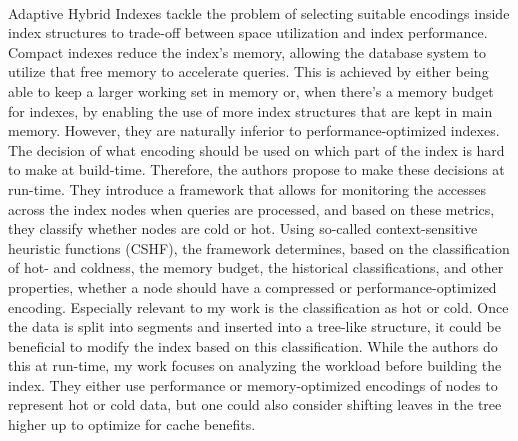 \paragraph{}
Adaptive Hybrid Indexes \cite{Anneser2022} tackle the problem of selecting suitable encodings inside index structures to trade-off between space utilization and index performance. Compact indexes reduce the index's memory, allowing the database system to utilize that free memory to accelerate queries. This is achieved by either being able to keep a larger working set in memory or, when there's a memory budget for indexes, by enabling the use of more index structures that are kept in main memory. However, they are naturally inferior to performance-optimized indexes. The decision of what encoding should be used on which part of the index is hard to make at build-time. Therefore, the authors propose to make these decisions at run-time. They introduce a framework that allows for monitoring the accesses across the index nodes when queries are processed, and based on these metrics, they classify whether nodes are cold or hot. Using so-called context-sensitive heuristic functions (CSHF), the framework determines, based on the classification of hot- and coldness, the memory budget, the historical classifications, and other properties, whether a node should have a compressed or performance-optimized encoding. Especially relevant to my work is the classification as hot or cold. Once the data is split into segments and inserted into a tree-like structure, it could be beneficial to modify the index based on this classification. While the authors do this at run-time, my work focuses on analyzing the workload before building the index. They either use performance or memory-optimized encodings of nodes to represent hot or cold data, but one could also consider shifting leaves in the tree higher up to optimize for cache benefits.

